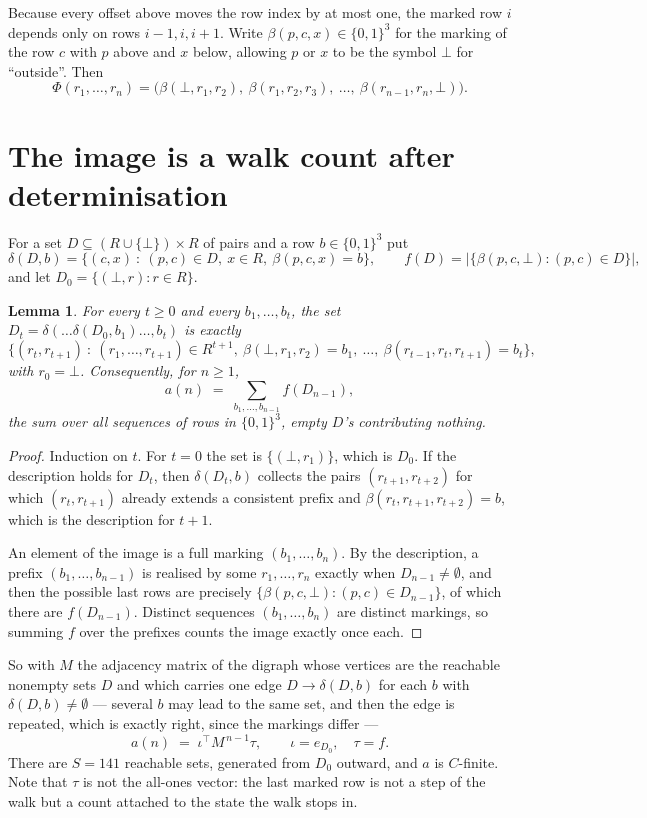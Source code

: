 \documentclass[11pt,a4paper]{article}
\theoremstyle{plain}
\newtheorem{lemma}[theorem]{Lemma}
\theoremstyle{definition}
\begin{document}
Because every offset above moves the row index by at most one, the marked row $i$ depends only
on rows $i-1,i,i+1$. Write $\beta(p,c,x)\in\{0,1\}^{3}$ for the marking of the row $c$
with $p$ above and $x$ below, allowing $p$ or $x$ to be the symbol $\bot$ for ``outside''.
Then
\[
\Phi(r_1,\dots,r_n)=\bigl(\beta(\bot,r_1,r_2),\ \beta(r_1,r_2,r_3),\ \dots,\
\beta(r_{n-1},r_n,\bot)\bigr).
\]

\section{The image is a walk count after determinisation}

For a set $D\subseteq(R\cup\{\bot\})\times R$ of pairs and a row $b\in\{0,1\}^{3}$ put
\[
\delta(D,b)=\{(c,x)\ :\ (p,c)\in D,\ x\in R,\ \beta(p,c,x)=b\},\qquad
f(D)=\bigl|\{\beta(p,c,\bot):(p,c)\in D\}\bigr| ,
\]
and let $D_0=\{(\bot,r):r\in R\}$.

\begin{lemma}\label{lem:det}
For every $t\ge0$ and every $b_1,\dots,b_t$, the set
$D_t=\delta(\dots\delta(D_0,b_1)\dots,b_t)$ is exactly
\[
\{(r_t,r_{t+1})\ :\ (r_1,\dots,r_{t+1})\in R^{t+1},\ \beta(\bot,r_1,r_2)=b_1,\ \dots,\
\beta(r_{t-1},r_t,r_{t+1})=b_t\} ,
\]
with $r_0=\bot$. Consequently, for $n\ge1$,
\[
a(n)\;=\;\sum_{b_1,\dots,b_{n-1}}f(D_{n-1}),
\]
the sum over all sequences of rows in $\{0,1\}^{3}$, empty $D$'s contributing nothing.
\end{lemma}

\begin{proof}
Induction on $t$. For $t=0$ the set is $\{(\bot,r_1)\}$, which is $D_0$. If the description
holds for $D_t$, then $\delta(D_t,b)$ collects the pairs $(r_{t+1},r_{t+2})$ for which
$(r_t,r_{t+1})$ already extends a consistent prefix and
$\beta(r_t,r_{t+1},r_{t+2})=b$, which is the description for $t+1$.

An element of the image is a full marking $(b_1,\dots,b_n)$. By the description, a prefix
$(b_1,\dots,b_{n-1})$ is realised by some $r_1,\dots,r_n$ exactly when $D_{n-1}\neq
\emptyset$, and then the possible last rows are precisely
$\{\beta(p,c,\bot):(p,c)\in D_{n-1}\}$, of which there are $f(D_{n-1})$. Distinct
sequences $(b_1,\dots,b_n)$ are distinct markings, so summing $f$ over the prefixes counts the
image exactly once each.
\end{proof}

So with $M$ the adjacency matrix of the digraph whose vertices are the reachable nonempty sets
$D$ and which carries one edge $D\to\delta(D,b)$ for each $b$ with $\delta(D,b)\neq\emptyset$
--- several $b$ may lead to the same set, and then the edge is repeated, which is exactly
right, since the markings differ ---
\[
a(n)\;=\;\iota^{\!\top}M^{\,n-1}\tau,\qquad \iota=e_{D_0},\quad \tau=f .
\]
There are $S=141$ reachable sets, generated from $D_0$ outward, and $a$ is $C$-finite. Note
that $\tau$ is not the all-ones vector: the last marked row is not a step of the walk but a
count attached to the state the walk stops in.
\end{document}
